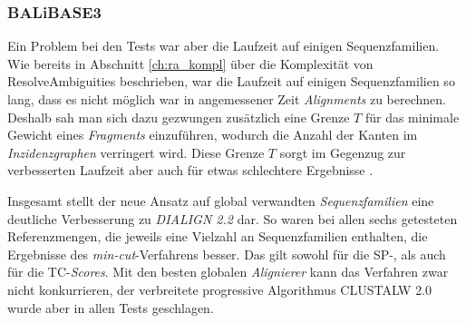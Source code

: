\subsubsection{BALiBASE3}

Ein Problem bei den Tests war aber die Laufzeit auf einigen Sequenzfamilien. Wie bereits in Abschnitt \ref{ch:ra_kompl} über die Komplexität von \textrm{ResolveAmbiguities} beschrieben, war die Laufzeit auf einigen Sequenzfamilien so lang, dass es nicht möglich war in angemessener Zeit \emph{Alignments} zu berechnen. Deshalb sah man sich dazu gezwungen zusätzlich eine Grenze $T$ für das minimale Gewicht eines \emph{Fragments} einzuführen, wodurch die Anzahl der Kanten im \emph{Inzidenzgraphen} verringert wird. Diese Grenze $T$ sorgt im Gegenzug zur verbesserten Laufzeit aber auch für etwas schlechtere Ergebnisse \citep{cpm10}.

Insgesamt stellt der neue Ansatz auf global verwandten \emph{Sequenzfamilien} eine deutliche Verbesserung zu \emph{DIALIGN 2.2} dar. So waren bei allen sechs getesteten Referenzmengen, die jeweils eine Vielzahl an Sequenzfamilien enthalten, die Ergebnisse des \emph{min-cut}-Verfahrens besser. Das gilt sowohl für die SP-, als auch für die TC-\emph{Scores}. Mit den besten globalen \emph{Alignierer} kann das Verfahren zwar nicht konkurrieren, der verbreitete progressive Algorithmus CLUSTALW 2.0 wurde aber in allen Tests geschlagen. 






























